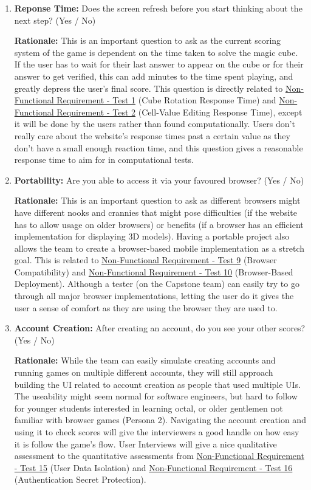 \documentclass[12pt, titlepage]{article}
\begin{document}
\begin{enumerate}
    \item \textbf{Reponse Time:} Does the screen refresh before you start thinking about the next step? (Yes / No)
    
    \textbf{Rationale:} This is an important question to ask as the current scoring system of the game is dependent on the time taken to solve the magic cube. If the user has to wait for their last answer to 
    appear on the cube or for their answer to get verified, this can add minutes to the time spent playing, and greatly depress the user's final score. This question is directly related to
    \hyperref[NFR-T1]{Non-Functional Requirement - Test 1} (Cube Rotation Response Time) and \hyperref[NFR-T2]{Non-Functional Requirement - Test 2} (Cell-Value Editing Response Time), except it will be done by the users 
    rather than found computationally. Users don't really care about the website's response times past a certain value as they don't have a small enough reaction time, and this question gives a reasonable response time 
    to aim for in computational tests.
    
    
    \item \textbf{Portability:} Are you able to access it via your favoured browser? (Yes / No)
    
    \textbf{Rationale:} This is an important question to ask as different browsers might have different nooks and crannies that might pose difficulties (if the website has to allow usage on older browsers) or
    benefits (if a browser has an efficient implementation for displaying 3D models). Having a portable project also allows the team to create a browser-based mobile implementation as a stretch goal. This is
    related to \hyperref[NFR-T9]{Non-Functional Requirement - Test 9} (Browser Compatibility) and \hyperref[NFR-T10]{Non-Functional Requirement - Test 10} (Browser-Based Deployment). Although a tester (on the 
    Capstone team) can easily try to go through all major browser implementations, letting the user do it gives the user a sense of comfort as they are using the browser they are used to.

    
    \item \textbf{Account Creation:} After creating an account, do you see your other scores? (Yes / No)
    
    \textbf{Rationale:} While the team can easily simulate creating accounts and running games on multiple different accounts, they will still approach building the UI related to account creation as people that
    used multiple UIs. The useability might seem normal for software engineers, but hard to follow for younger students interested in learning octal, or older gentlemen not familiar with browser games (Persona 2).
    Navigating the account creation and using it to check scores will give the interviewers a good handle on how easy it is follow the game's flow. User Interviews will give a nice qualitative assessment to the 
    quantitative assessments from \hyperref[NFR-T15]{Non-Functional Requirement - Test 15} (User Data Isolation) and \hyperref[NFR-T16]{Non-Functional Requirement - Test 16} (Authentication Secret Protection).





\end{enumerate}
\end{document}
